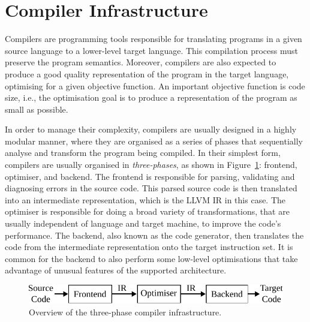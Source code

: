 
\section{Compiler Infrastructure}

Compilers are programming tools responsible for translating programs in a given source language to a lower-level target language.
This compilation process must preserve the program semantics.
Moreover, compilers are also expected to produce a good quality representation of the program in the target language, optimising for a given objective function.
An important objective function is code size, i.e., the optimisation goal is to produce a representation of the program as small as possible.


In order to manage their complexity, compilers are usually designed in a highly modular manner, where they are organised as a series of phases that sequentially analyse and transform the program being compiled.
In their simplest form, compilers are usually organised in \textit{three-phases}, as shown in Figure~\ref{fig:3-phase-compiler}: frontend, optimiser, and backend.
The frontend is responsible for parsing, validating and diagnosing errors in the source code.
This parsed source code is then translated into an intermediate representation, which is the LLVM IR in this case.
The optimiser is responsible for doing a broad variety of transformations, that are usually independent of language and target machine, to improve the code's performance.
The backend, also known as the code generator, then translates the code from the intermediate representation onto the target instruction set.
It is common for the backend to also perform some low-level optimisations that take advantage of unusual features of the supported architecture.

\begin{figure}[h]
  \centering
  \includegraphics[scale=0.9]{src/background/figs/3-phase-compiler.pdf}
  \caption{Overview of the three-phase compiler infrastructure.}
  \label{fig:3-phase-compiler}
\end{figure}



